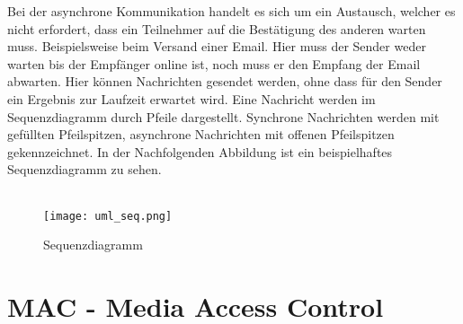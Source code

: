 Bei der asynchrone Kommunikation handelt es sich um ein Austausch, welcher es nicht erfordert, dass ein Teilnehmer auf die Bestätigung des anderen warten muss. Beispielsweise beim Versand einer Email. Hier muss der Sender weder warten bis der Empfänger online ist, noch muss er den Empfang der Email abwarten. Hier können Nachrichten gesendet werden, ohne dass für den Sender ein Ergebnis zur Laufzeit erwartet wird.
Eine Nachricht werden im Sequenzdiagramm durch Pfeile dargestellt. Synchrone Nachrichten werden mit gefüllten Pfeilspitzen, asynchrone Nachrichten mit offenen Pfeilspitzen gekennzeichnet. In der Nachfolgenden Abbildung ist ein beispielhaftes Sequenzdiagramm zu sehen.\\
\\
\begin{figure}[H]
\centering
\texttt{[image: uml\_seq.png]}
\caption{Sequenzdiagramm}
\label{fig:show_s1_s2_p1_n1}
\end{figure}

\section{MAC - Media Access Control}
\label{sec:mac}

